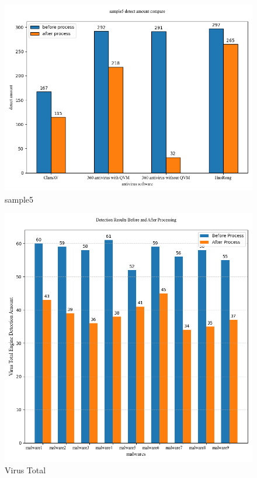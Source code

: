 \begin{figure}[htbp]
  \includegraphics[scale=0.60]{images/sample5.png}
  \caption{sample5}\label{fig:sample5}
\end{figure}
\begin{figure}[htbp]
  \centering
  \includegraphics[scale=0.6]{images/Virus_Total.png}
  \caption{Virus Total}\label{fig:Virus_Total}
\end{figure}
